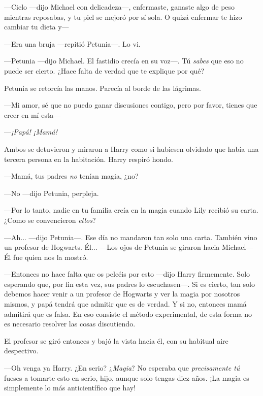 —Cielo —dijo Michael con delicadeza—, enfermaste, ganaste algo de peso mientras reposabas, y tu piel se mejoró por sí sola. O quizá enfermar te hizo cambiar tu dieta y—

—Era una bruja —repitió Petunia—. Lo vi.

—Petunia —dijo Michael. El fastidio crecía en su voz—. Tú \emph{sabes} que eso no puede ser cierto. ¿Hace falta de verdad que te explique por qué?

Petunia se retorcía las manos. Parecía al borde de las lágrimas.

—Mi amor, sé que no puedo ganar discusiones contigo, pero por favor, tienes que creer en mí esta—

—\emph{¡Papá! ¡Mamá!}

Ambos se detuvieron y miraron a Harry como si hubiesen olvidado que había una tercera persona en la habitación. Harry respiró hondo.

—Mamá, tus padres \emph{no} tenían magia, ¿no?

—No —dijo Petunia, perpleja.

—Por lo tanto, nadie en tu familia creía en la magia cuando Lily recibió su carta. ¿Como se convencieron \emph{ellos}?

—Ah... —dijo Petunia—. Ese día no mandaron tan solo una carta. También vino un profesor de Hogwarts. Él... —Los ojos de Petunia se giraron hacia Michael— Él fue quien nos la mostró.

—Entonces no hace falta que os peleéis por esto —dijo Harry firmemente. Solo esperando que, por fin esta vez, sus padres lo escuchasen—. Si es cierto, tan solo debemos hacer venir a un profesor de Hogwarts y ver la magia por nosotros mismos, y papá tendrá que admitir que es de verdad. Y si no, entonces mamá admitirá que es falsa. En eso consiste el método experimental, de esta forma no es necesario resolver las cosas discutiendo.

El profesor se giró entonces y bajó la vista hacia él, con su habitual aire despectivo.

—Oh venga ya Harry. ¿En serio? ¿\emph{Magia}? No esperaba que \emph{precisamente tú} fueses a tomarte esto en serio, hijo, aunque solo tengas diez años. ¡La magia es simplemente lo más anticientífico que hay!

